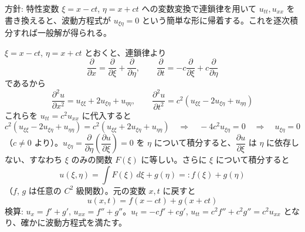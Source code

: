 
方針: 特性変数 $\xi = x-ct$, $\eta = x+ct$ への変数変換で連鎖律を用いて $u_{tt}, u_{xx}$ を書き換えると、波動方程式が $u_{\xi\eta}=0$ という簡単な形に帰着する。これを逐次積分すれば一般解が得られる。

$\xi = x-ct$, $\eta = x+ct$ とおくと、連鎖律より
\[
\frac{\partial}{\partial x} = \frac{\partial}{\partial \xi} + \frac{\partial}{\partial \eta}, \qquad
\frac{\partial}{\partial t} = -c\frac{\partial}{\partial \xi} + c\frac{\partial}{\partial \eta}
\]
であるから
\[
\frac{\partial^{2} u}{\partial x^{2}} = u_{\xi\xi} + 2u_{\xi\eta} + u_{\eta\eta}, \qquad
\frac{\partial^{2} u}{\partial t^{2}} = c^{2}\left(u_{\xi\xi} - 2u_{\xi\eta} + u_{\eta\eta}\right)
\]
これらを $u_{tt} = c^{2}u_{xx}$ に代入すると
\[
c^{2}\left(u_{\xi\xi} - 2u_{\xi\eta} + u_{\eta\eta}\right) = c^{2}\left(u_{\xi\xi} + 2u_{\xi\eta} + u_{\eta\eta}\right)
\quad\Longrightarrow\quad
-4c^{2}u_{\xi\eta} = 0
\quad\Longrightarrow\quad
u_{\xi\eta} = 0
\]
（$c \neq 0$ より）。$u_{\xi\eta} = \dfrac{\partial}{\partial \eta}\left(\dfrac{\partial u}{\partial \xi}\right) = 0$ を $\eta$ について積分すると、$\dfrac{\partial u}{\partial \xi}$ は $\eta$ に依存しない、すなわち $\xi$ のみの関数 $F(\xi)$ に等しい。さらに $\xi$ について積分すると
\[
u(\xi,\eta) = \int F(\xi)\,d\xi + g(\eta) =: f(\xi) + g(\eta)
\]
（$f$, $g$ は任意の $C^{2}$ 級関数）。元の変数 $x, t$ に戻すと
\[
\boxed{\; u(x,t) = f(x-ct) + g(x+ct) \;}
\]
検算: $u_x = f' + g'$, $u_{xx} = f'' + g''$。$u_t = -cf' + cg'$, $u_{tt} = c^{2}f'' + c^{2}g'' = c^{2}u_{xx}$ となり、確かに波動方程式を満たす。
